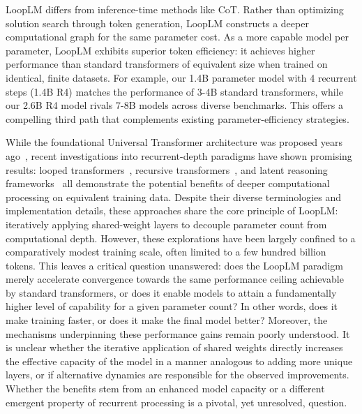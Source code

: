\documentclass[]{bytedance_seed}
\newcommand{\1}{\mathbf{1}}
\newcommand{\ut}{LoopLM}
\newcommand{\ridger}[1]{\textcolor{blue}{[RJ: #1]}}
\begin{document}
\ut{} differs from inference-time methods like CoT. Rather than optimizing solution search through token generation, \ut{} constructs a deeper computational graph for the same parameter cost. As a more capable model per parameter, \ut{} exhibits superior token efficiency: it achieves higher performance than standard transformers of equivalent size when trained on identical, finite datasets. For example, our 1.4B parameter model with 4 recurrent steps (1.4B R4) matches the performance of 3-4B standard transformers, while our 2.6B R4 model rivals 7-8B models across diverse benchmarks. This offers a compelling third path that complements existing parameter-efficiency strategies.





While the foundational Universal Transformer architecture was proposed years ago~\cite{dehghani2018universal}, recent investigations into recurrent-depth paradigms have shown promising results: looped transformers~\cite{saunshi2025reasoning}, recursive transformers~\cite{bae2024relaxed}, and latent reasoning frameworks~\cite{geiping2025scaling,zeng2025pretraining} all demonstrate the potential benefits of deeper computational processing on equivalent training data. Despite their diverse terminologies and implementation details, these approaches share the core principle of \ut{}: iteratively applying shared-weight layers to decouple parameter count from computational depth. However, these explorations have been largely confined to a comparatively modest training scale, often limited to a few hundred billion tokens. This leaves a critical question unanswered: does the \ut{} paradigm merely accelerate convergence towards the same performance ceiling achievable by standard transformers, or does it enable models to attain a fundamentally higher level of capability for a given parameter count? In other words, does it make training faster, or does it make the final model better? Moreover, the mechanisms underpinning these performance gains remain poorly understood. It is unclear whether the iterative application of shared weights directly increases the effective capacity of the model in a manner analogous to adding more unique layers, or if alternative dynamics are responsible for the observed improvements. Whether the benefits stem from an enhanced model capacity or a different emergent property of recurrent processing is a pivotal, yet unresolved, question.
\end{document}
